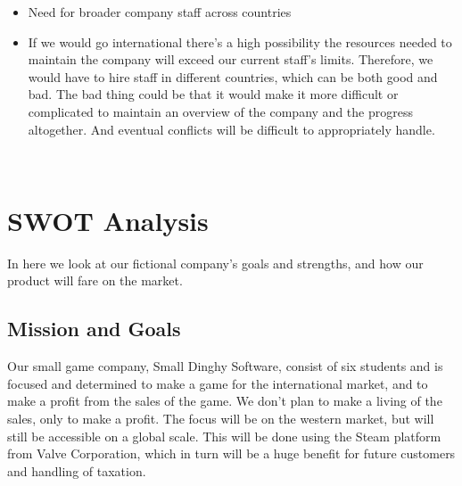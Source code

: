 	\begin{itemize}
		\item Need for broader company staff across countries
	\end{itemize}
	\begin{itemize}
	\item 	If we would go international there’s a high possibility the resources
   needed to maintain the company will exceed our current staff’s limits.
    Therefore, we would have to hire staff in different countries, which
    can be both good and bad. The bad thing could be that it would make
    it more difficult or complicated to maintain an overview of the company
     and the progress altogether. And eventual conflicts will be difficult
     to appropriately handle.
		 \end{itemize}
	\\
	\section{SWOT Analysis}
	In here we look at our fictional company’s goals and strengths, and how
   our product will fare on the market.
	\\
	\subsection{Mission and Goals}
	Our small game company, Small Dinghy Software, consist of six students
   and is focused and determined to make a game for the international market,
    and to make a profit from the sales of the game. We don’t plan to make a
     living of the sales, only to make a profit. The focus will be on the
     western market, but will still be accessible on a global scale. This
     will be done using the Steam platform from Valve Corporation, which
     in turn will be a huge benefit for future customers and handling of
     taxation.
	\\

